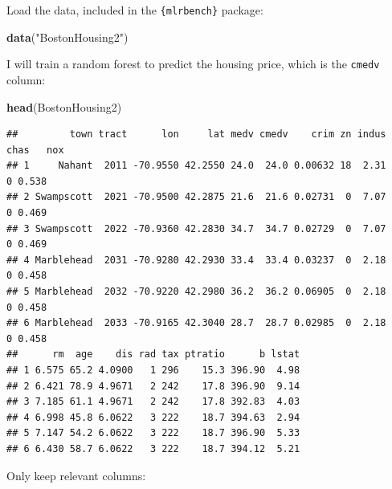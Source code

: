 \documentclass[]{gitbook}
\newenvironment{Shaded}{\begin{snugshade}}{\end{snugshade}}
\newcommand{\DataTypeTok}[1]{\textcolor[rgb]{0.13,0.29,0.53}{#1}}
\newcommand{\KeywordTok}[1]{\textcolor[rgb]{0.13,0.29,0.53}{\textbf{#1}}}
\newcommand{\NormalTok}[1]{#1}
\newcommand{\OperatorTok}[1]{\textcolor[rgb]{0.81,0.36,0.00}{\textbf{#1}}}
\newcommand{\StringTok}[1]{\textcolor[rgb]{0.31,0.60,0.02}{#1}}
\theoremstyle{definition}
\theoremstyle{definition}
\theoremstyle{definition}
\theoremstyle{remark}
\begin{document}
Load the data, included in the \texttt{\{mlrbench\}} package:

\begin{Shaded}
\begin{Highlighting}[]
\KeywordTok{data}\NormalTok{(}\StringTok{"BostonHousing2"}\NormalTok{)}
\end{Highlighting}
\end{Shaded}

I will train a random forest to predict the housing price, which is the
\texttt{cmedv} column:

\begin{Shaded}
\begin{Highlighting}[]
\KeywordTok{head}\NormalTok{(BostonHousing2)}
\end{Highlighting}
\end{Shaded}

\begin{verbatim}
##         town tract      lon     lat medv cmedv    crim zn indus chas   nox
## 1     Nahant  2011 -70.9550 42.2550 24.0  24.0 0.00632 18  2.31    0 0.538
## 2 Swampscott  2021 -70.9500 42.2875 21.6  21.6 0.02731  0  7.07    0 0.469
## 3 Swampscott  2022 -70.9360 42.2830 34.7  34.7 0.02729  0  7.07    0 0.469
## 4 Marblehead  2031 -70.9280 42.2930 33.4  33.4 0.03237  0  2.18    0 0.458
## 5 Marblehead  2032 -70.9220 42.2980 36.2  36.2 0.06905  0  2.18    0 0.458
## 6 Marblehead  2033 -70.9165 42.3040 28.7  28.7 0.02985  0  2.18    0 0.458
##      rm  age    dis rad tax ptratio      b lstat
## 1 6.575 65.2 4.0900   1 296    15.3 396.90  4.98
## 2 6.421 78.9 4.9671   2 242    17.8 396.90  9.14
## 3 7.185 61.1 4.9671   2 242    17.8 392.83  4.03
## 4 6.998 45.8 6.0622   3 222    18.7 394.63  2.94
## 5 7.147 54.2 6.0622   3 222    18.7 396.90  5.33
## 6 6.430 58.7 6.0622   3 222    18.7 394.12  5.21
\end{verbatim}

Only keep relevant columns:

\begin{Shaded}
\end{Shaded}
\end{document}
